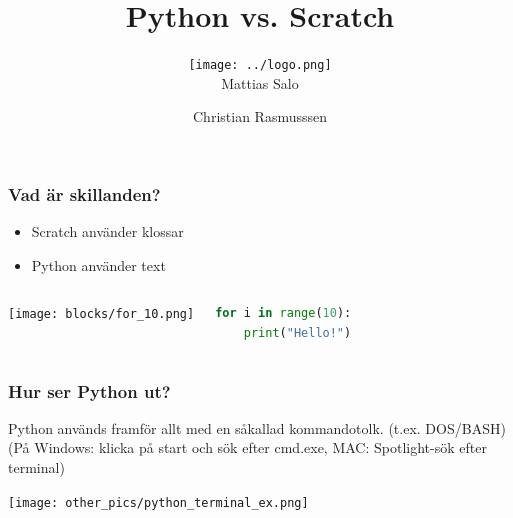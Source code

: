 \documentclass{beamer}
\author[Mattias Salo \and Christian Rasmussen]{\texttt{[image: ../logo.png]}\\Mattias Salo \and Christian Rasmusssen}
\title{Python vs. Scratch}
\institute{CoderDojo Linköping}
\begin{document}
\begin{frame}
\maketitle
\end{frame}


\begin{frame}[fragile]
	\frametitle{Vad är skillanden?}

	\begin{itemize}
		\item{Scratch använder klossar}
		\item{Python använder text}
	\end{itemize}
	\begin{columns}[c] %
    \begin{center}
     \texttt{[image: blocks/for\_10.png]}
     \end{center}
\begin{lstlisting}[language=Python]
for i in range(10):
    print("Hello!")
\end{lstlisting}
    \end{columns}
\end{frame}

\begin{frame}
	\frametitle{Hur ser Python ut?}
	Python används framför allt med en såkallad kommandotolk. (t.ex. DOS/BASH)
	(På Windows: klicka på start och sök efter cmd.exe, MAC: Spotlight-sök efter terminal)\\
	\begin{center}
	\texttt{[image: other\_pics/python\_terminal\_ex.png]}
	\end{center}
\end{frame}
\end{document}
